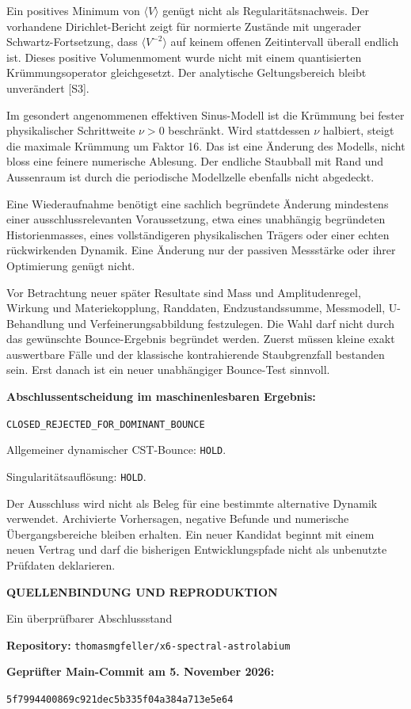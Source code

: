 \documentclass[11pt,a4paper]{article}
\newcommand{\kicker}[1]{{\sffamily\bfseries\small\color{teal}#1}\par}
\newcommand{\tit}[1]{{\sffamily\bfseries\LARGE\raggedright #1\par}\vspace{3pt}}
\newcommand{\sect}[1]{\par\vspace{3pt}{\sffamily\bfseries\large #1}\par}
\newcommand{\note}[1]{\par\colorbox{wash}{\parbox{\dimexpr\linewidth-2\fboxsep}{\vspace{4pt}#1\vspace{4pt}}}\par}
\begin{document}
\sect{Die Singularitätsfrage bleibt separat}
Ein positives Minimum von $\langle V\rangle$ genügt nicht als Regularitätsnachweis. Der vorhandene Dirichlet-Bericht zeigt für normierte Zustände mit ungerader Schwartz-Fortsetzung, dass $\langle V^{-2}\rangle$ auf keinem offenen Zeitintervall überall endlich ist. Dieses positive Volumenmoment wurde nicht mit einem quantisierten Krümmungsoperator gleichgesetzt. Der analytische Geltungsbereich bleibt unverändert [S3].

Im gesondert angenommenen effektiven Sinus-Modell ist die Krümmung bei fester physikalischer Schrittweite $\nu>0$ beschränkt. Wird stattdessen $\nu$ halbiert, steigt die maximale Krümmung um Faktor 16. Das ist eine Änderung des Modells, nicht bloss eine feinere numerische Ablesung. Der endliche Staubball mit Rand und Aussenraum ist durch die periodische Modellzelle ebenfalls nicht abgedeckt.

\sect{Kriterien für eine neue Kandidaten-ID}
Eine Wiederaufnahme benötigt eine sachlich begründete Änderung mindestens einer ausschlussrelevanten Voraussetzung, etwa eines unabhängig begründeten Historienmasses, eines vollständigeren physikalischen Trägers oder einer echten rückwirkenden Dynamik. Eine Änderung nur der passiven Messstärke oder ihrer Optimierung genügt nicht.

Vor Betrachtung neuer später Resultate sind Mass und Amplitudenregel, Wirkung und Materiekopplung, Randdaten, Endzustandssumme, Messmodell, U-Behandlung und Verfeinerungsabbildung festzulegen. Die Wahl darf nicht durch das gewünschte Bounce-Ergebnis begründet werden. Zuerst müssen kleine exakt auswertbare Fälle und der klassische kontrahierende Staubgrenzfall bestanden sein. Erst danach ist ein neuer unabhängiger Bounce-Test sinnvoll.

\note{\textbf{Abschlussentscheidung im maschinenlesbaren Ergebnis:}\par
\texttt{CLOSED\_REJECTED\_FOR\_DOMINANT\_BOUNCE}\par
Allgemeiner dynamischer CST-Bounce: \texttt{HOLD}.\par
Singularitätsauflösung: \texttt{HOLD}.}

Der Ausschluss wird nicht als Beleg für eine bestimmte alternative Dynamik verwendet. Archivierte Vorhersagen, negative Befunde und numerische Übergangsbereiche bleiben erhalten. Ein neuer Kandidat beginnt mit einem neuen Vertrag und darf die bisherigen Entwicklungspfade nicht als unbenutzte Prüfdaten deklarieren.

\newpage
\kicker{QUELLENBINDUNG UND REPRODUKTION}
\tit{Ein überprüfbarer Abschlussstand}
\textbf{Repository:} \texttt{thomasmgfeller/x6-spectral-astrolabium}\par
\textbf{Geprüfter Main-Commit am 5. November 2026:}\par
{\small\texttt{5f7994400869c921dec5b335f04a384a713e5e64}}
\end{document}
